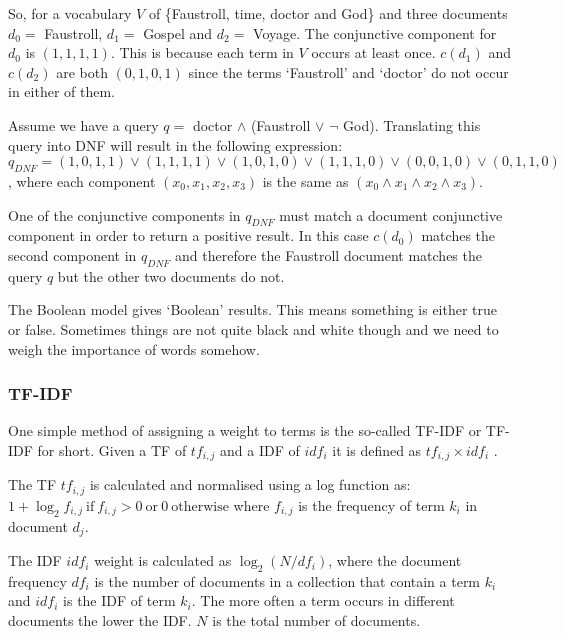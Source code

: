 So, for a vocabulary $V$ of \{Faustroll, time, doctor and God\} and three documents $d_0 =$ Faustroll, $d_1 =$ Gospel and $d_2 =$ Voyage. The conjunctive component for $d_0$ is $(1,1,1,1)$. This is because each term in $V$ occurs at least once. $c(d_1)$ and $c(d_2)$ are both $(0,1,0,1)$ since the terms `Faustroll' and `doctor' do not occur in either of them.

Assume we have a query $q =$ doctor $\land$ (Faustroll $\lor$ $\neg$ God). Translating this query into \ac{DNF} will result in the following expression: $q_{DNF} = (1,0,1,1) \lor (1,1,1,1) \lor (1,0,1,0) \lor (1,1,1,0) \lor (0,0,1,0) \lor (0,1,1,0)$, where each component $(x_0,x_1,x_2,x_3)$ is the same as $(x_0 \land x_1 \land x_2 \land x_3)$.


One of the conjunctive components in $q_{DNF}$ must match a document conjunctive component in order to return a positive result. In this case $c(d_0)$ matches the second component in $q_{DNF}$ and therefore the Faustroll document matches the query $q$ but the other two documents do not.

The Boolean model gives `Boolean' results. This means something is either true or false. Sometimes things are not quite black and white though and we need to weigh the importance of words somehow.


\subsubsection{TF-IDF}
\label{s:tfidf}

One simple method of assigning a weight to terms is the so-called \acl{TF}-\acl{IDF} or \acs{TF}-\acs{IDF} for short. Given a \acs{TF} of $tf_{i,j}$ and a \acs{IDF} of $idf_i$ it is defined as $tf_{i,j}\times idf_i$ \autocite{Baeza-Yates2011}.

The \ac{TF} $tf_{i,j}$ is calculated and normalised using a log function as:
$1+\log_2 f_{i,j} \ \text{if} \ f_{i,j} > 0 \ \text{or} \ 0 \ \text{otherwise}$ where $f_{i,j}$ is the frequency of term $k_i$ in document $d_j$.

The \ac{IDF} $idf_i$ weight is calculated as $\log_2 (N/df_i)$, where the document frequency $df_i$ is the number of documents in a collection that contain a term $k_i$ and $idf_i$ is the \ac{IDF} of term $k_i$. The more often a term occurs in different documents the lower the \ac{IDF}. $N$ is the total number of documents.

